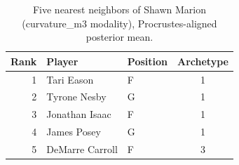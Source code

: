\begin{table}[htbp]
  \centering\small
  \begin{tabular}{rllc}
    \toprule
    Rank & Player & Position & Archetype \\
    \midrule
    1 & Tari Eason & F & 1 \\
    2 & Tyrone Nesby & G & 1 \\
    3 & Jonathan Isaac & F & 1 \\
    4 & James Posey & G & 1 \\
    5 & DeMarre Carroll & F & 3 \\
    \bottomrule
  \end{tabular}
  \caption{Five nearest neighbors of Shawn Marion (curvature_m3 modality), Procrustes-aligned posterior mean.}
  \label{tab:Shawn_Marion_neighbors_curvature_m3}
\end{table}


